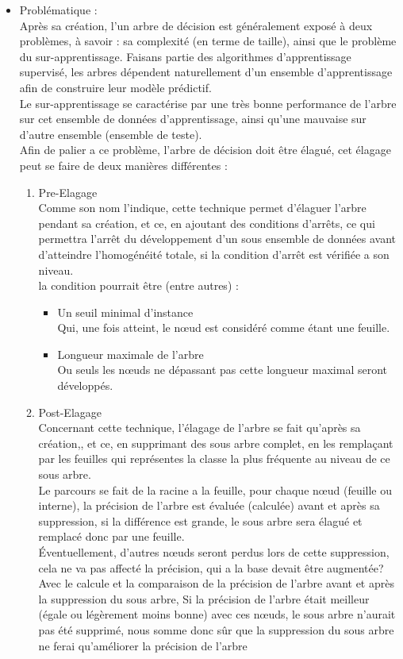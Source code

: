 \documentclass[a4paper, 11pt]{report}
\begin{document}
 
\begin{itemize}
\item Problématique : \\
Après sa création, l'un arbre de décision est généralement exposé à deux problèmes, à savoir : sa complexité (en terme de taille), ainsi que le problème du sur-apprentissage. Faisans partie des algorithmes d'apprentissage supervisé, les arbres dépendent naturellement d'un ensemble d'apprentissage afin de construire leur modèle prédictif. 
\\Le sur-apprentissage se caractérise par une très bonne performance de l'arbre  sur cet ensemble de données d'apprentissage, ainsi qu'une mauvaise sur d'autre ensemble (ensemble de teste).\\
Afin de palier a ce problème, l'arbre de décision doit être élagué, cet élagage peut se faire de deux manières différentes : \\
\begin{enumerate}
\item Pre-Elagage \\
Comme son nom l'indique, cette technique permet d'élaguer l'arbre pendant sa création, et ce, en ajoutant des conditions d'arrêts, ce qui permettra l'arrêt du développement d'un sous ensemble de données avant d'atteindre l'homogénéité totale, si la condition d'arrêt est vérifiée a son niveau.\\
la condition pourrait être (entre autres) :
\begin{itemize}
\item Un seuil minimal d'instance\\
Qui, une fois atteint, le nœud est considéré comme étant une feuille.
\item Longueur maximale de l'arbre\\
Ou seuls les nœuds ne dépassant pas cette longueur maximal seront développés.
\end{itemize}
\item Post-Elagage\\
Concernant cette technique, l'élagage de l'arbre se fait qu'après sa création,, et ce, en supprimant des sous arbre complet, en les remplaçant par les feuilles qui représentes la classe la plus fréquente  au niveau de ce sous arbre.\\
Le parcours se fait de la racine a la feuille, pour chaque nœud (feuille ou interne), la précision de l'arbre est évaluée (calculée) avant et après sa suppression, si la différence est grande, le sous arbre sera élagué et remplacé donc par une feuille. 
\\Éventuellement, d'autres nœuds seront perdus lors de cette suppression, cela ne va pas affecté la précision, qui a la base devait être augmentée?\\
Avec le calcule et la comparaison de la précision de l'arbre avant et après la suppression du sous arbre,
Si la précision de l'arbre était meilleur (égale ou légèrement moins bonne) avec ces nœuds, le sous arbre n'aurait pas été supprimé, nous somme donc sûr que la suppression du sous arbre ne ferai qu'améliorer la précision de l'arbre
\end{enumerate}
\end{itemize}
\end{document}
